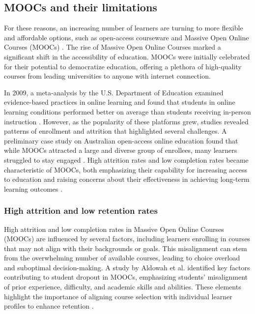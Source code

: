 \subsection{MOOCs and their limitations}
For these reasons, an increasing number of learners are turning to more flexible and affordable options, such as open-access courseware and Massive Open Online Courses (MOOCs) \cite{harish_online_2013} \cite{pampouri_massive_2021}. The rise of Massive Open Online Courses marked a significant shift in the accessibility of education. MOOCs were initially celebrated for their potential to democratize education, offering a plethora of high-quality courses from leading universities to anyone with internet connection. 

In 2009, a meta-analysis by the U.S. Department of Education examined evidence-based practices in online learning and found that students in online learning conditions performed better on average than students receiving in-person instruction \cite{means_evaluation_2009}. However, as the popularity of these platforms grew, studies revealed patterns of enrollment and attrition that highlighted several challenges. A preliminary case study on Australian open-access online education found that while MOOCs attracted a large and diverse group of enrollees, many learners struggled to stay engaged \cite{greenland_patterns_2014}. High attrition rates and low completion rates became characteristic of MOOCs, both emphasizing their capability for increasing access to education and raising concerns about their effectiveness in achieving long-term learning outcomes \cite{clow_moocs_2013}. 

\subsubsection{High attrition and low retention rates}

High attrition and low completion rates in Massive Open Online Courses (MOOCs) are influenced by several factors, including learners enrolling in courses that may not align with their backgrounds or goals. This misalignment can stem from the overwhelming number of available courses, leading to choice overload and suboptimal decision-making. A study by Aldowah et al. identified key factors contributing to student dropout in MOOCs, emphasizing students’ misalignment of prior experience, difficulty, and academic skills and abilities. These elements highlight the importance of aligning course selection with individual learner profiles to enhance retention \cite{noauthor_factors_nodate}. 

